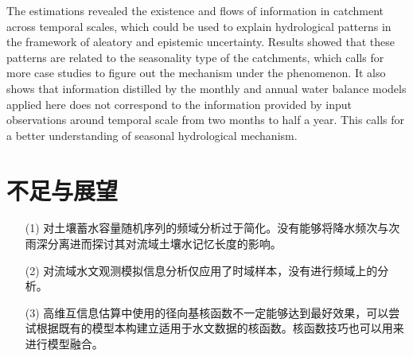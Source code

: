 The estimations revealed the existence and flows of information in catchment across temporal scales, which could be used to explain hydrological patterns in the framework of aleatory and epistemic uncertainty. Results showed that these patterns are related to the seasonality type of the catchments, which calls for more case studies to figure out the mechanism under the phenomenon. It also shows that information distilled by the monthly and annual water balance models applied here does not correspond to the information provided by input observations around temporal scale from two months to half a year. This calls for a better understanding of seasonal hydrological mechanism. 


\fi






\section{不足与展望}
\begin{enumerate}
\item[(1)]对土壤蓄水容量随机序列的频域分析过于简化。没有能够将降水频次与次雨深分离进而探讨其对流域土壤水记忆长度的影响。
\item[(2)]对流域水文观测模拟信息分析仅应用了时域样本，没有进行频域上的分析。
\item[(3)]高维互信息估算中使用的径向基核函数不一定能够达到最好效果，可以尝试根据既有的模型本构建立适用于水文数据的核函数。核函数技巧也可以用来进行模型融合。
\end{enumerate}

\iffalse
”当你沉浸在自己的理论宇宙中太久，你会察觉不到他人对于你的理论的困惑，因为你先入为主地假设了所有人都明白很多基础知识“\ref{}牛津大学数学教授金明迥。
\fi

 

 